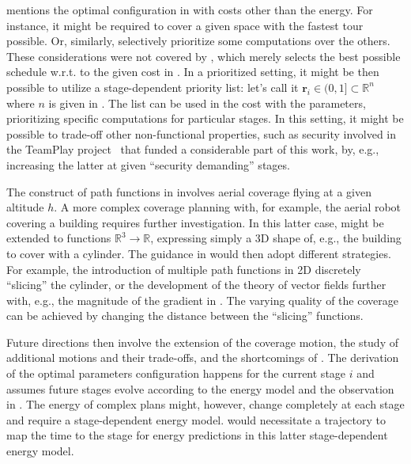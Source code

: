 
 mentions the optimal configuration in  with costs other than the energy. For instance, it might be required to cover a given space with the fastest tour possible. Or, similarly, selectively prioritize some computations over the others. These considerations were not covered by , which merely selects the best possible schedule w.r.t. to the given cost in . In a prioritized setting, it might be then possible to utilize a stage-dependent priority list: let's call it $\mathbf{r}_i\in(0,1]\subset\mathbb{R}^n$ where $n$ is given in . The list can be used in the cost with the parameters,  prioritizing specific computations for particular stages. In this setting, it might be possible to trade-off other non-functional properties, such as security involved in the TeamPlay project~\citep{teamplay} that funded a considerable part of this work, by, e.g., increasing the latter at given ``security demanding'' stages.


The construct of path functions in  involves aerial coverage flying at a given altitude $h$. A more complex coverage planning with, for example, the aerial robot covering a building requires further investigation. In this latter case,  might be extended to functions $\mathbb{R}^3\rightarrow\mathbb{R}$, expressing simply a 3D shape of, e.g., the building to cover with a cylinder. The guidance in  would then adopt different strategies. For example, the introduction of multiple path functions in 2D discretely ``slicing'' the cylinder, or the development of the theory of vector fields further with, e.g., the magnitude of the gradient in . The varying quality of the coverage can be achieved by changing the distance between the ``slicing'' functions.


Future directions then involve the extension of the coverage motion, the study of additional motions and their trade-offs, and the shortcomings of . The derivation of the optimal parameters configuration happens for the current stage $i$ and assumes future stages evolve according to the energy model and the observation in . The energy of complex plans might, however, change completely at each stage and require a stage-dependent energy model.  would necessitate a trajectory to map the time to the stage for energy predictions in this latter stage-dependent energy model.

